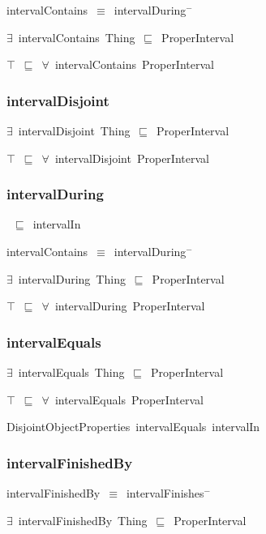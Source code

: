 \documentclass{article}
\begin{document}
intervalContains~\ensuremath{\equiv}~intervalDuring\ensuremath{^-}

\ensuremath{\exists}~intervalContains~Thing~\ensuremath{\sqsubseteq}~ProperInterval

\ensuremath{\top}~\ensuremath{\sqsubseteq}~\ensuremath{\forall}~intervalContains~ProperInterval

\subsubsection*{intervalDisjoint}

\ensuremath{\exists}~intervalDisjoint~Thing~\ensuremath{\sqsubseteq}~ProperInterval

\ensuremath{\top}~\ensuremath{\sqsubseteq}~\ensuremath{\forall}~intervalDisjoint~ProperInterval

\subsubsection*{intervalDuring}

~\ensuremath{\sqsubseteq}~intervalIn

intervalContains~\ensuremath{\equiv}~intervalDuring\ensuremath{^-}

\ensuremath{\exists}~intervalDuring~Thing~\ensuremath{\sqsubseteq}~ProperInterval

\ensuremath{\top}~\ensuremath{\sqsubseteq}~\ensuremath{\forall}~intervalDuring~ProperInterval

\subsubsection*{intervalEquals}

\ensuremath{\exists}~intervalEquals~Thing~\ensuremath{\sqsubseteq}~ProperInterval

\ensuremath{\top}~\ensuremath{\sqsubseteq}~\ensuremath{\forall}~intervalEquals~ProperInterval

DisjointObjectProperties~intervalEquals~intervalIn~

\subsubsection*{intervalFinishedBy}

intervalFinishedBy~\ensuremath{\equiv}~intervalFinishes\ensuremath{^-}

\ensuremath{\exists}~intervalFinishedBy~Thing~\ensuremath{\sqsubseteq}~ProperInterval
\end{document}
